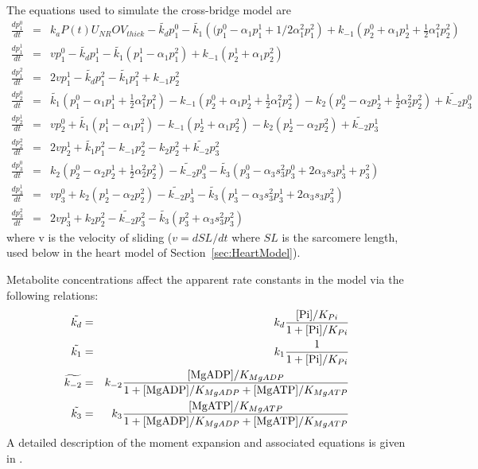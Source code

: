 \documentclass[fleqn,10pt]{physiome}
\begin{document}
The equations used to simulate the cross-bridge model are
\begin{eqnarray}\label{eq:equations_crossbridge}
\frac{dp_1^0}{dt} &=& k_a P(t)  U_{NR} OV_{thick} - \tilde{k_d} p_1^0 - 
    \tilde{k_1}\left((p_1^0-\alpha_1 p_1^1+1/2 \alpha_1^2 p_1^2\right) + 
    k_{-1} \left( p_2^0+\alpha_1 p_2^1+ \frac{1}{2}\alpha_1^2 p_2^2  \right) \nonumber \\
\frac{dp_1^1}{dt} &=& v p_1^0 - \tilde{k_d} p_1^1 - 
    \tilde{k_1} \left( p_1^1-\alpha_1 p_1^2 \right) 
    + k_{-1} \left(p_2^1 + \alpha_1 p_2^2 \right) \nonumber \\
\frac{dp_1^2}{dt} &=& 2vp_1^1 - \tilde{k_d} p_1^2 - 
    \tilde{k_1} p_1^2 + k_{-1} p_2^2 \nonumber \\
\frac{dp_2^0}{dt} &=& \tilde{k_1}\left(p_1^0 - \alpha_1 p_1^1 + 
    \frac{1}{2} \alpha_1^2 p_1^2 \right) - k_{-1} \left(p_2^0 + 
    \alpha_1 p_2^1 + \frac{1}{2} \alpha_1^2 p_2^2\right) -  
     k_2 \left(p_2^0 - \alpha_2 p_2^1 + \frac{1}{2} \alpha_2^2 p_2^2 \right) + 
     \widetilde{k_{-2}}p_3^0 \nonumber \\
\frac{dp_2^1}{dt} &=& v p_2^0  +\tilde{k_1}\left(p_1^1-\alpha_1 p_1^2 \right) - 
    k_{-1}\left(p_2^1 + \alpha_1 p_2^2 \right) - k_2 \left(p_2^1-\alpha_2 p_2^2 \right) + 
    \widetilde{k_{-2}}p_3^1 \nonumber \\
\frac{dp_2^2}{dt} &=& 2v p_2^1  +\tilde{k_1}p_1^2 - k_{-1} p_2^2 - 
    k_2 p_2^2+ \widetilde{k_{-2}}p_3^2 \nonumber \\
\frac{dp_3^0}{dt} &=& k_2 \left(p_2^0 - \alpha_2 p_2^1 + 
    \frac{1}{2}\alpha_2^2 p_2^2 \right) - \widetilde{k_{-2}}p_3^0  - 
    \tilde{k_3}\left(p_3^0 - \alpha_3 s_3^2 p_3^0 + 
    2\alpha_3 s_3 p_3^1+p_3^2 \right) \nonumber \\	
\frac{dp_3^1}{dt} &=& v p_3^0 + k_2 \left(p_2^1 - \alpha_2 p_2^2 \right) - 
    \widetilde{k_{-2}}p_3^1 - \tilde{k_3}\left(p_3^1 - \alpha_3 s_3^2 p_3^1 + 2\alpha_3 s_3 p_3^2 \right) \nonumber \\
\frac{dp_3^2}{dt} &=& 2v p_3^1+k_2 p_2^2- \widetilde{k_{-2}}p_3^2  - 
    \tilde{k_3}\left(p_3^2+\alpha_3 s_3^2 p_3^2 \right)
\end{eqnarray}
where v is the velocity of sliding ($v=dSL/dt$ where $SL$ is the sarcomere length, used below in the heart model of Section~\ref{sec:HeartModel}).

Metabolite concentrations affect the apparent rate constants in the model via the following relations:
\begin{eqnarray}
\tilde{k_d}     &=&  k_d  \frac{ [{\rm Pi}]/K_{Pi} }{1+ [{\rm Pi}]/K_{Pi} } 	\nonumber \\
\tilde{k_1}     &=&  k_1  \frac{1}{1+ [{\rm Pi}]/K_{Pi} } 	\nonumber \\
\widetilde{k_{-2} } &=& k_{-2}  \frac{[{\rm MgADP}]/K_{MgADP} }
    {1+ [{\rm MgADP}]/K_{MgADP} + [{\rm MgATP}]/K_{MgATP} } \nonumber \\				
\tilde{k_3}     &=& k_3      \frac{[{\rm MgATP}]/K_{MgATP} }
    {1+ [{\rm MgADP}]/K_{MgADP} + [{\rm MgATP}]/K_{MgATP} } 							
\end{eqnarray}
A detailed description of the moment expansion and associated equations is given in \cite{Tewari2016a}. 
\end{document}
